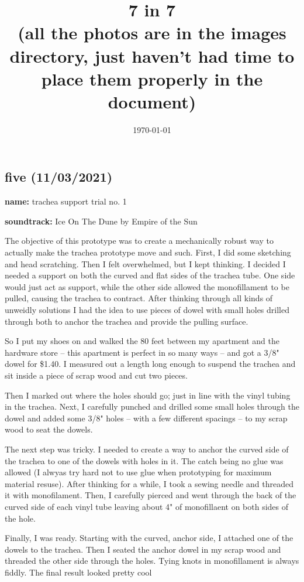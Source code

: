 \documentclass[11pt]{report}
\title{{\LARGE\textbf{7 in 7}} \\ (all the photos are in the images directory, just haven't had time to place them properly in the document)}
\date{\today}
\begin{document}
\maketitle
\newpage
\subsection*{five (11/03/2021)}
\textbf{name:} trachea support trial no. 1

\textbf{soundtrack:} Ice On The Dune by Empire of the Sun

The objective of this prototype was to create a mechanically robust way to actually make the trachea prototype move and such. First, I did some sketching and head scratching. Then I felt overwhelmed, but I kept thinking. I decided I needed a support on both the curved and flat sides of the trachea tube. One side would just act as support, while the other side allowed the monofillament to be pulled, causing the trachea to contract. After thinking through all kinds of unweidly solutions I had the idea to use pieces of dowel with small holes drilled through both to anchor the trachea and provide the pulling surface. 

So I put my shoes on and walked the 80 feet between my apartment and the hardware store -- this apartment is perfect in so many ways -- and got a 3/8" dowel for \$1.40. I measured out a length long enough to suspend the trachea and sit inside a piece of scrap wood and cut two pieces. 

Then I marked out where the holes should go; just in line with the vinyl tubing in the trachea. Next, I carefully punched and drilled some small holes through the dowel and added some 3/8" holes -- with a few different spacings -- to my scrap wood to seat the dowels.


The next step was tricky. I needed to create a way to anchor the curved side of the trachea to one of the dowels with holes in it. The catch being no glue was allowed (I alwyas try hard not to use glue when prototyping for maximum material resuse). After thinking for a while, I took a sewing needle and threaded it with monofilament. Then, I carefully pierced and went through the back of the curved side of each vinyl tube leaving about 4" of monofillaent on both sides of the hole. 

Finally, I was ready. Starting with the curved, anchor side, I attached one of the dowels to the trachea. Then I seated the anchor dowel in my scrap wood and threaded the other side through the holes. Tying knots in monofillament is always fiddly. The final result looked pretty cool 
\end{document}
